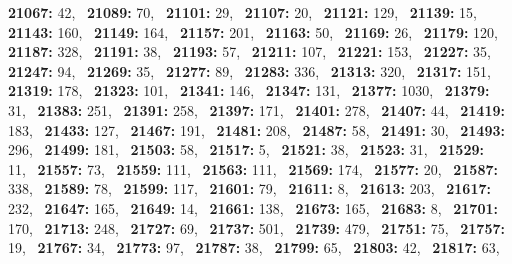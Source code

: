 \textbf{21067:} 42,\allowbreak~ 
\textbf{21089:} 70,\allowbreak~ 
\textbf{21101:} 29,\allowbreak~ 
\textbf{21107:} 20,\allowbreak~ 
\textbf{21121:} 129,\allowbreak~ 
\textbf{21139:} 15,\allowbreak~ 
\textbf{21143:} 160,\allowbreak~ 
\textbf{21149:} 164,\allowbreak~ 
\textbf{21157:} 201,\allowbreak~ 
\textbf{21163:} 50,\allowbreak~ 
\textbf{21169:} 26,\allowbreak~ 
\textbf{21179:} 120,\allowbreak~ 
\textbf{21187:} 328,\allowbreak~ 
\textbf{21191:} 38,\allowbreak~ 
\textbf{21193:} 57,\allowbreak~ 
\textbf{21211:} 107,\allowbreak~ 
\textbf{21221:} 153,\allowbreak~ 
\textbf{21227:} 35,\allowbreak~ 
\textbf{21247:} 94,\allowbreak~ 
\textbf{21269:} 35,\allowbreak~ 
\textbf{21277:} 89,\allowbreak~ 
\textbf{21283:} 336,\allowbreak~ 
\textbf{21313:} 320,\allowbreak~ 
\textbf{21317:} 151,\allowbreak~ 
\textbf{21319:} 178,\allowbreak~ 
\textbf{21323:} 101,\allowbreak~ 
\textbf{21341:} 146,\allowbreak~ 
\textbf{21347:} 131,\allowbreak~ 
\textbf{21377:} 1030,\allowbreak~ 
\textbf{21379:} 31,\allowbreak~ 
\textbf{21383:} 251,\allowbreak~ 
\textbf{21391:} 258,\allowbreak~ 
\textbf{21397:} 171,\allowbreak~ 
\textbf{21401:} 278,\allowbreak~ 
\textbf{21407:} 44,\allowbreak~ 
\textbf{21419:} 183,\allowbreak~ 
\textbf{21433:} 127,\allowbreak~ 
\textbf{21467:} 191,\allowbreak~ 
\textbf{21481:} 208,\allowbreak~ 
\textbf{21487:} 58,\allowbreak~ 
\textbf{21491:} 30,\allowbreak~ 
\textbf{21493:} 296,\allowbreak~ 
\textbf{21499:} 181,\allowbreak~ 
\textbf{21503:} 58,\allowbreak~ 
\textbf{21517:} 5,\allowbreak~ 
\textbf{21521:} 38,\allowbreak~ 
\textbf{21523:} 31,\allowbreak~ 
\textbf{21529:} 11,\allowbreak~ 
\textbf{21557:} 73,\allowbreak~ 
\textbf{21559:} 111,\allowbreak~ 
\textbf{21563:} 111,\allowbreak~ 
\textbf{21569:} 174,\allowbreak~ 
\textbf{21577:} 20,\allowbreak~ 
\textbf{21587:} 338,\allowbreak~ 
\textbf{21589:} 78,\allowbreak~ 
\textbf{21599:} 117,\allowbreak~ 
\textbf{21601:} 79,\allowbreak~ 
\textbf{21611:} 8,\allowbreak~ 
\textbf{21613:} 203,\allowbreak~ 
\textbf{21617:} 232,\allowbreak~ 
\textbf{21647:} 165,\allowbreak~ 
\textbf{21649:} 14,\allowbreak~ 
\textbf{21661:} 138,\allowbreak~ 
\textbf{21673:} 165,\allowbreak~ 
\textbf{21683:} 8,\allowbreak~ 
\textbf{21701:} 170,\allowbreak~ 
\textbf{21713:} 248,\allowbreak~ 
\textbf{21727:} 69,\allowbreak~ 
\textbf{21737:} 501,\allowbreak~ 
\textbf{21739:} 479,\allowbreak~ 
\textbf{21751:} 75,\allowbreak~ 
\textbf{21757:} 19,\allowbreak~ 
\textbf{21767:} 34,\allowbreak~ 
\textbf{21773:} 97,\allowbreak~ 
\textbf{21787:} 38,\allowbreak~ 
\textbf{21799:} 65,\allowbreak~ 
\textbf{21803:} 42,\allowbreak~ 
\textbf{21817:} 63,\allowbreak~ 
